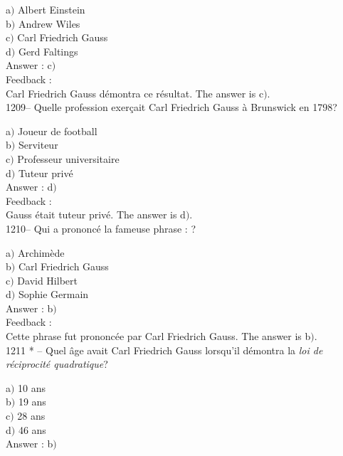 ﻿\documentclass[letterpaper, 12pt]{article}
\begin{document}
a$)$ Albert Einstein\\
b$)$ Andrew Wiles \\
c$)$ Carl Friedrich Gauss \\
d$)$ Gerd Faltings \\

Answer : c$)$\\

Feedback : \\
Carl Friedrich Gauss d\'emontra ce r\'esultat.
The answer is c$)$.\\

1209-- Quelle profession exer\c cait Carl Friedrich Gauss \`a
Brunswick en 1798?

a$)$ Joueur de football\\
b$)$ Serviteur \\
c$)$ Professeur universitaire \\
d$)$ Tuteur priv\'e \\

Answer : d$)$\\

Feedback : \\
Gauss \'etait tuteur priv\'e.
The answer is d$)$.\\

1210-- Qui a prononc\'e la fameuse phrase : \fg ?

a$)$ Archim\`ede \\
b$)$ Carl Friedrich Gauss \\
c$)$ David Hilbert \\
d$)$ Sophie Germain\\

Answer : b$)$\\

Feedback : \\
Cette phrase fut prononc\'ee par Carl Friedrich Gauss.
The answer is b$)$.\\

1211 * -- Quel \^age avait Carl Friedrich Gauss lorsqu'il d\'emontra
la {\sl loi de r\'eciprocit\'e quadratique}?

a$)$ 10 ans \\
b$)$ 19 ans \\
c$)$ 28 ans \\
d$)$ 46 ans\\

Answer : b$)$\\
\end{document}
